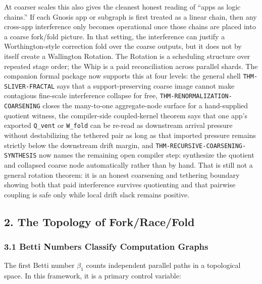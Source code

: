 \documentclass[
  11pt,
]{article}
\begin{document}
At coarser scales this also gives the cleanest honest reading of ``apps
as logic chains.'' If each Gnosis app or subgraph is first treated as a
linear chain, then any cross-app interference only becomes operational
once those chains are placed into a coarse fork/fold picture. In that
setting, the interference can justify a Worthington-style correction
fold over the coarse outputs, but it does not by itself create a
Wallington Rotation. The Rotation is a scheduling structure over
repeated stage order; the Whip is a paid reconciliation across parallel
shards. The companion formal package now supports this at four levels:
the general shell \texttt{THM-SLIVER-FRACTAL} says that a
support-preserving coarse image cannot make contagious fine-scale
interference collapse for free, \texttt{THM-RENORMALIZATION-COARSENING}
closes the many-to-one aggregate-node surface for a hand-supplied
quotient witness, the compiler-side coupled-kernel theorem says that one
app's exported \texttt{Q\_vent} or \texttt{W\_fold} can be re-read as
downstream arrival pressure without destabilizing the tethered pair as
long as that imported pressure remains strictly below the downstream
drift margin, and \texttt{THM-RECURSIVE-COARSENING-SYNTHESIS} now names
the remaining open compiler step: synthesize the quotient and collapsed
coarse node automatically rather than by hand. That is still not a
general rotation theorem: it is an honest coarsening and tethering
boundary showing both that paid interference survives quotienting and
that pairwise coupling is safe only while local drift slack remains
positive.

\subsection{2. The Topology of
Fork/Race/Fold}\label{the-topology-of-forkracefold}

\subsubsection{3.1 Betti Numbers Classify Computation
Graphs}\label{betti-numbers-classify-computation-graphs}

The first Betti number \(\beta_1\) counts independent parallel paths in
a topological space. In this framework, it is a primary control
variable:
\end{document}
